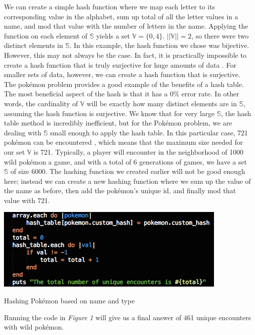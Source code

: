 \documentclass{article}
\begin{document}
We can create a simple hash function where we map each letter to its corresponding value in the alphabet, sum up total of all the letter values in a name, and mod that value with the number of letters in the name. 
Applying the function on each element of $\mathbb{S}$ yields a set $\mathbb{V} = \{0,4\}$. $||\mathbb{V}|| = 2$, so there were two distinct elements in $\mathbb{S}$. In this example, the hash function we chose was bijective.
However, this may not always be the case. In fact, it is practically impossible to create a hash function that is truly surjective for huge amounts of data \cite[p. 6]{Maurer}. 
For smaller sets of data, however, we can create a hash function that is surjective. 
The pok\'emon problem provides a good example of the benefits of a hash table.\\
\indent The most beneficial aspect of the hash is that it has a 0\% error rate. 
In other words, the cardinality of $\mathbb{V}$ will be exactly how many distinct elements are in $\mathbb{S}$, assuming the hash function is surjective. 
We know that for very large $\mathbb{S}$, the hash table method is incredibly inefficient, but for the Pok\'emon problem, we are dealing with $\mathbb{S}$ small enough to apply the hash table. 
In this particular case, 721 pok\'emon can be encountered \cite{Pokemon}, which means that the maximum size needed for our set $\mathbb{V}$ is 721. 
Typically, a player will encounter in the neighborhood of 1000 wild pok\'emon a game, and with a total of 6 generations of games, we have a set $\mathbb{S}$ of size 6000. 
The hashing function we created earlier will not be good enough here; instead we can create a new hashing function where we sum up the value of the name as before, then add the pok\'emon's unique id, and finally mod that value with 721.
\begin{floatingfigure}[H!]{8cm}
\centering
\begin{framed}
\includegraphics[scale=0.4]{pkmn_problem/hash_01}
\caption{Hashing Pok\'emon based on name and type}
\end{framed}
\end{floatingfigure}
\noindent Running the code in \textit{Figure 1} will give us a final answer of 461 unique encounters with wild pok\'emon. 
\end{document}
